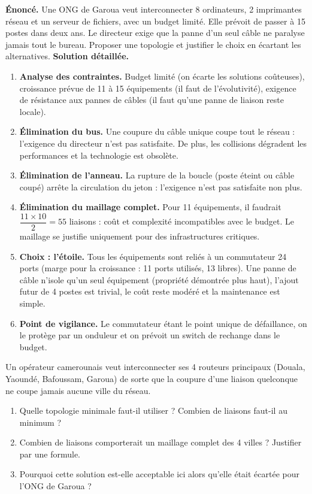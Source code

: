 \documentclass[11pt]{article}
\begin{document}
\begin{exoresolu}
\textbf{Énoncé.} Une ONG de Garoua veut interconnecter 8 ordinateurs, 2 imprimantes réseau et un serveur de fichiers, avec un budget limité. Elle prévoit de passer à 15 postes dans deux ans. Le directeur exige que la panne d'un seul câble ne paralyse jamais tout le bureau. Proposer une topologie et justifier le choix en écartant les alternatives.
\tcblower
\textbf{Solution détaillée.}
\begin{enumerate}
\item \textbf{Analyse des contraintes.} Budget limité (on écarte les solutions coûteuses), croissance prévue de 11 à 15 équipements (il faut de l'évolutivité), exigence de résistance aux pannes de câbles (il faut qu'une panne de liaison reste locale).
\item \textbf{Élimination du bus.} Une coupure du câble unique coupe tout le réseau : l'exigence du directeur n'est pas satisfaite. De plus, les collisions dégradent les performances et la technologie est obsolète.
\item \textbf{Élimination de l'anneau.} La rupture de la boucle (poste éteint ou câble coupé) arrête la circulation du jeton : l'exigence n'est pas satisfaite non plus.
\item \textbf{Élimination du maillage complet.} Pour 11 équipements, il faudrait $\dfrac{11 \times 10}{2} = 55$ liaisons : coût et complexité incompatibles avec le budget. Le maillage se justifie uniquement pour des infrastructures critiques.
\item \textbf{Choix : l'étoile.} Tous les équipements sont reliés à un commutateur 24 ports (marge pour la croissance : 11 ports utilisés, 13 libres). Une panne de câble n'isole qu'un seul équipement (propriété démontrée plus haut), l'ajout futur de 4 postes est trivial, le coût reste modéré et la maintenance est simple.
\item \textbf{Point de vigilance.} Le commutateur étant le point unique de défaillance, on le protège par un onduleur et on prévoit un switch de rechange dans le budget.
\end{enumerate}
\end{exoresolu}

\begin{exercice}
Un opérateur camerounais veut interconnecter ses 4 routeurs principaux (Douala, Yaoundé, Bafoussam, Garoua) de sorte que la coupure d'une liaison quelconque ne coupe jamais aucune ville du réseau.
\begin{enumerate}
\item Quelle topologie minimale faut-il utiliser ? Combien de liaisons faut-il au minimum ?
\item Combien de liaisons comporterait un maillage complet des 4 villes ? Justifier par une formule.
\item Pourquoi cette solution est-elle acceptable ici alors qu'elle était écartée pour l'ONG de Garoua ?
\end{enumerate}
\end{exercice}
\end{document}
